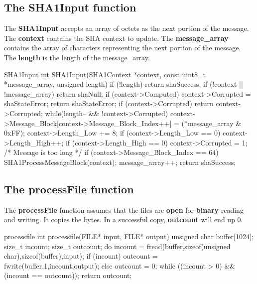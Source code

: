 \subsection{The SHA1Input function}
The {\bf SHA1Input} accepts an array of octets as the next portion
of the message. The {\bf context} contains the SHA context to update.
The {\bf message\_array} contains the array of characters representing 
the next portion of the message. The {\bf length} is the length of
the message\_array.
\begin{chunk}{SHA1Input}
int SHA1Input(SHA1Context    *context,
              const uint8_t  *message_array,
              unsigned       length) {
  if (!length) {
    return shaSuccess;
  }
  if (!context || !message_array) {
    return shaNull;
  }
  if (context->Computed) {
    context->Corrupted = shaStateError;
    return shaStateError;
  }
  if (context->Corrupted) {
     return context->Corrupted;
  }
  while(length-- && !context->Corrupted) {
    context->Message_Block[context->Message_Block_Index++] =
                  (*message_array & 0xFF);
    context->Length_Low += 8;
    if (context->Length_Low == 0) {
      context->Length_High++;
      if (context->Length_High == 0) {
        context->Corrupted = 1;   /* Message is too long */
      }
    }
    if (context->Message_Block_Index == 64) {
      SHA1ProcessMessageBlock(context);
    }
    message_array++;
  }
  return shaSuccess;
}

\end{chunk}

\subsection{The processFile function}
\noindent
The {\bf processFile} function assumes that the files are {\bf open}
for {\bf binary} reading and writing. It copies the bytes. In a
successful copy, {\bf outcount} will end up 0. 
\begin{chunk}{processfile}
int processfile(FILE* input, FILE* output) {
  unsigned char buffer[1024];
  size_t incount;
  size_t outcount;
  do {
    incount = fread(buffer,sizeof(unsigned char),sizeof(buffer),input);
    if (incount) {
      outcount = fwrite(buffer,1,incount,output); 
    } else {
      outcount = 0;
    }
  } while ((incount > 0) && (incount == outcount));
  return outcount;
}

\end{chunk} 

